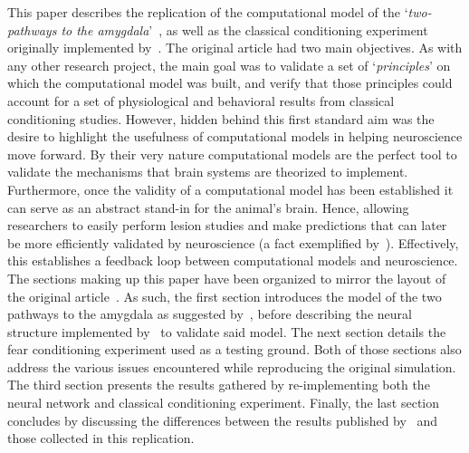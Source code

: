 
This paper describes the replication of the computational model of the `\emph{two-pathways to the amygdala}'~\supercite{Ledoux1992,Romanski1992}, as well as the classical conditioning experiment originally implemented by~\citet{Armony1995}. The original article had two main objectives. As with any other research project, the main goal was to validate a set of `\emph{principles}' on which the computational model was built, and verify that those principles could account for a set of physiological and behavioral results from classical conditioning studies. However, hidden behind this first standard aim was the desire to highlight the usefulness of computational models in helping neuroscience move forward. By their very nature computational models are the perfect tool to validate the mechanisms that brain systems are theorized to implement. Furthermore, once the validity of a computational model has been established it can serve as an abstract stand-in for the animal's brain. Hence, allowing researchers to easily perform lesion studies and make predictions that can later be more efficiently validated by neuroscience (a fact exemplified by~\citet{Armony1997,Armony1997a}). Effectively, this establishes a feedback loop between computational models and neuroscience.\\

The sections making up this paper have been organized to mirror the layout of the original article~\supercite{Armony1995}. As such, the first section introduces the model of the two pathways to the amygdala as suggested by~\citet{Ledoux1992}, before describing the neural structure implemented by~\citet{Armony1995} to validate said model. The next section details the fear conditioning experiment used as a testing ground. Both of those sections also address the various issues encountered while reproducing the original simulation. The third section presents the results gathered by re-implementing both the neural network and classical conditioning experiment. Finally, the last section concludes by discussing the differences between the results published by~\citet{Armony1995} and those collected in this replication.

